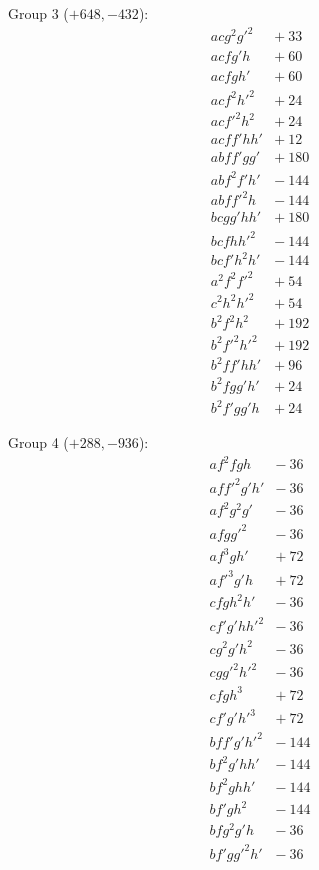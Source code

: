 \documentclass[11pt,a4paper]{article}
\begin{document}
\noindent Group 3 ($+648, -432$):
\[
\begin{array}{rr}
a c g^2 g'^2 & +\ 33\\
a c f g' h & +\ 60\\
a c f g h' & +\ 60\\
a c f^2 h'^2 & +\ 24\\
a c f'^2 h^2 & +\ 24\\
a c f f' h h' & +\ 12\\
a b f f' g g' & +\ 180\\
a b f^2 f' h' & -\ 144\\
a b f f'^2 h & -\ 144\\
b c g g' h h' & +\ 180\\
b c f h h'^2 & -\ 144\\
b c f' h^2 h' & -\ 144\\
a^2 f^2 f'^2 & +\ 54\\
c^2 h^2 h'^2 & +\ 54\\
b^2 f^2 h^2 & +\ 192\\
b^2 f'^2 h'^2 & +\ 192\\
b^2 f f' h h' & +\ 96\\
b^2 f g g' h' & +\ 24\\
b^2 f' g g' h & +\ 24
\end{array}
\]

\noindent Group 4 ($+288, -936$):
\[
\begin{array}{rr}
a f^2 f g h & -\ 36\\
a f f'^2 g' h' & -\ 36\\
a f^2 g^2 g' & -\ 36\\
a f g g'^2 & -\ 36\\
a f^3 g h' & +\ 72\\
a f'^3 g' h & +\ 72\\
c f g h^2 h' & -\ 36\\
c f' g' h h'^2 & -\ 36\\
c g^2 g' h^2 & -\ 36\\
c g g'^2 h'^2 & -\ 36\\
c f g h^3 & +\ 72\\
c f' g' h'^3 & +\ 72\\
b f f' g' h'^2 & -\ 144\\
b f^2 g' h h' & -\ 144\\
b f^2 g h h' & -\ 144\\
b f' g h^2 & -\ 144\\
b f g^2 g' h & -\ 36\\
b f' g g'^2 h' & -\ 36
\end{array}
\]
\end{document}
